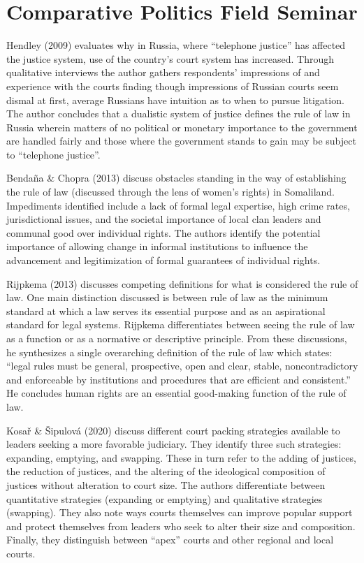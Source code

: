 \documentclass[
  english,
  man]{article}
\author{\phantom{0}}
\date{}
\affiliation{\phantom{0}}
\begin{document}
\hypertarget{comparative-politics-field-seminar}{%
\section{Comparative Politics Field Seminar}\label{comparative-politics-field-seminar}}

Hendley (2009) evaluates why in Russia, where \enquote{telephone justice} has affected the justice system, use of the country's court system has increased. Through qualitative interviews the author gathers respondents' impressions of and experience with the courts finding though impressions of Russian courts seem dismal at first, average Russians have intuition as to when to pursue litigation. The author concludes that a dualistic system of justice defines the rule of law in Russia wherein matters of no political or monetary importance to the government are handled fairly and those where the government stands to gain may be subject to \enquote{telephone justice}.

Bendaña \& Chopra (2013) discuss obstacles standing in the way of establishing the rule of law (discussed through the lens of women's rights) in Somaliland. Impediments identified include a lack of formal legal expertise, high crime rates, jurisdictional issues, and the societal importance of local clan leaders and communal good over individual rights. The authors identify the potential importance of allowing change in informal institutions to influence the advancement and legitimization of formal guarantees of individual rights.

Rijpkema (2013) discusses competing definitions for what is considered the rule of law. One main distinction discussed is between rule of law as the minimum standard at which a law serves its essential purpose and as an aspirational standard for legal systems. Rijpkema differentiates between seeing the rule of law as a function or as a normative or descriptive principle. From these discussions, he synthesizes a single overarching definition of the rule of law which states: \enquote{legal rules must be general, prospective, open and clear, stable, noncontradictory and enforceable by institutions and procedures that are efficient and consistent.} He concludes human rights are an essential good-making function of the rule of law.

Kosař \& Šipulová (2020) discuss different court packing strategies available to leaders seeking a more favorable judiciary. They identify three such strategies: expanding, emptying, and swapping. These in turn refer to the adding of justices, the reduction of justices, and the altering of the ideological composition of justices without alteration to court size. The authors differentiate between quantitative strategies (expanding or emptying) and qualitative strategies (swapping). They also note ways courts themselves can improve popular support and protect themselves from leaders who seek to alter their size and composition. Finally, they distinguish between \enquote{apex} courts and other regional and local courts.
\end{document}
